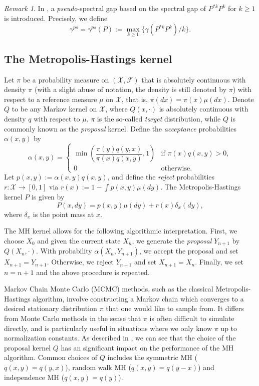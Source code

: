 \documentclass[12pt,a4]{amsart}
\numberwithin{equation}{section}
\theoremstyle{plain}
\theoremstyle{definition}
\theoremstyle{remark}
\newtheorem{rk}{Remark}[section]
\newcommand{\1}{\mathds{1}}
\renewcommand{\geq}{\geqslant}
\begin{document}
\begin{rk}
	In \cite{Paulin15}, a \textit{pseudo}-spectral gap based on the spectral gap of $P^{*k}P^k$ for $k \geq 1$ is introduced. Precisely, we define
	$$\gamma^{ps} = \gamma^{ps}(P) := \max_{k \geq 1} \{\gamma(P^{*k}P^k)/k\}.$$
\end{rk}

\subsection{The Metropolis-Hastings kernel}

Let $\pi$ be a probability measure on $(\mathcal{X},\mathcal{F})$ that is absolutely continuous with density $\pi$ (with a slight abuse of notation, the density is still denoted by $\pi$) with respect to a reference measure $\mu$ on $\mathcal{X}$, that is, $\pi(dx) = \pi(x) \mu(dx)$. Denote $Q$ to be any Markov kernel on $\mathcal{X}$, where $Q(x,\cdot)$ is absolutely continuous with density $q$ with respect to $\mu$. $\pi$ is the so-called \textit{target} distribution, while $Q$ is commonly known as the \textit{proposal} kernel. Define the \textit{acceptance} probabilities $\alpha(x,y)$ by
\[\alpha(x,y) = \begin{cases} \min \left(\dfrac{\pi(y)q(y,x)}{\pi(x)q(x,y)},1 \right) &\mbox{if } \pi(x)q(x,y) > 0, \\
0 & \mbox{otherwise.} \end{cases}\]
Let $p(x,y) := \alpha(x,y) q(x,y)$, and define the \textit{reject} probabilities $r : \mathcal{X} \to [0,1]$ via $r(x) := 1 - \int p(x,y) \mu(dy)$. The Metropolis-Hastings kernel $P$ is given by
$$P(x,dy) = p(x,y) \mu(dy) + r(x)\delta_x(dy),$$
where $\delta_x$ is the point mass at $x$.

The MH kernel allows for the following algorithmic interpretation. First, we choose $X_0$ and given the current state $X_n$, we generate the \textit{proposal} $Y_{n+1}$ by $Q(X_n,\cdot)$. With probability $\alpha(X_n,Y_{n+1})$, we accept the proposal and set $X_{n+1} = Y_{n+1}$. Otherwise, we reject $Y_{n+1}$ and set $X_{n+1} = X_n$. Finally, we set $n = n+1$ and the above procedure is repeated.

Markov Chain Monte Carlo (MCMC) methods, such as the classical Metropolis-Hastings algorithm, involve constructing a Markov chain which converges to a desired stationary distribution $\pi$ that one would like to sample from. It differs from Monte Carlo methods in the sense that $\pi$ is often difficult to simulate directly, and is particularly useful in situations where we only know $\pi$ up to normalization constants. As described in \cite{RR04}, we can see that the choice of the proposal kernel $Q$ has an significant impact on the performance of the MH algorithm. Common choices of $Q$ includes the symmetric MH ($q(x,y) = q(y,x)$), random walk MH ($q(x,y) = q(y-x)$) and independence MH ($q(x,y) = q(y)$).
		
\end{document}
